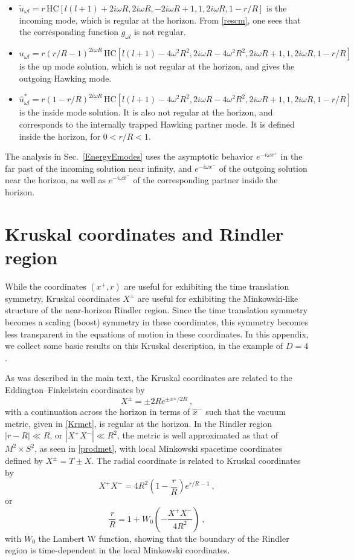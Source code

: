 \documentclass[12pt]{article}
\numberwithin{equation}{section}
\newcommand{\beq}{\begin{equation}}
\newcommand{\eeq}{\end{equation}}
\begin{document}
\begin{itemize}
\item $\tilde{u}_{\omega l} = r \, \mathrm{HC}[l(l+1)+2 i \omega R, 2 i \omega R, -2 i \omega R + 1, 1, 2 i \omega R, 1-r/R]$ is the incoming mode, which is regular at the horizon. From \eqref{rescm}, one sees that the corresponding function $g_{\omega l}$ is not regular.

\item $u_{\omega l} = r(r/R-1)^{2i\omega R} \, \mathrm{HC}[l(l + 1) - 4 \omega^2R^2, 2 i \omega R - 4 \omega^2R^2, 2 i \omega R + 1, 1, 2 i \omega R, 1-r/R]$ is the up mode solution, which is not regular at the horizon, and gives the outgoing Hawking mode.

\item $\hat{u}_{\omega l}^* = r(1-r/R)^{2i\omega R} \, \mathrm{HC}[l(l + 1) - 4 \omega^2R^2, 2 i \omega R - 4 \omega^2R^2, 2 i \omega R + 1, 1, 2 i \omega R,  1-r/R]$ is the inside mode solution. It is also not regular at the horizon, and corresponds to the internally trapped Hawking partner mode. It is defined inside the horizon, for $0<r/R<1$.
\end{itemize}
The analysis in Sec.~\ref{EnergyEmodes} uses the asymptotic behavior  $e^{-i\omega x^+}$ in the far past of the incoming solution near infinity, and  $e^{-i\omega x^-}$ of the outgoing solution near the horizon, as well as $e^{-i\omega \hat{x}^-}$ of the corresponding partner  inside the horizon.

\section{Kruskal coordinates and Rindler region}
\label{Kapp}

While the coordinates $(x^+,r)$ are useful for exhibiting the time translation symmetry, Kruskal coordinates $X^\pm$ are useful for exhibiting the Minkowski-like structure of the near-horizon Rindler region.  Since the time translation symmetry becomes a scaling (boost) symmetry in these coordinates, this symmetry becomes less transparent in the equations of motion in these coordinates.  In this appendix, we collect some basic results on this Kruskal description, in the example of $D=4$.

As was described in the main text, the Kruskal coordinates are related to the Eddington--Finkelstein coordinates by
\beq\label{Kcoorddef}
X^{\pm} = \pm 2R e^{\pm{ x^{\pm}}/{2R}}\ ,
\eeq
with a continuation across the horizon in terms of $\hat x^-$ such that the vacuum metric, given in \eqref{Krmet},  is regular at the horizon.  
In the Rindler region $|r-R|\ll R$, or $|X^+X^-|\ll R^2$, the metric is well approximated as that of $M^2\times S^2$, as seen in \eqref{prodmet}, with local Minkowski spacetime coordinates defined by $X^\pm=T\pm X$.  The radial coordinate is related to Kruskal coordinates by
\beq
X^+X^-=4R^2 \left(1-\frac{r}{R}\right) e^{r/R-1}\ ,
\eeq
or
\beq\label{rtoK}
\frac{r}{R}= 1+ W_0\left(-\frac{X^+X^-}{4R^2 }\right)\ ,
\eeq
with $W_0$ the Lambert W function, showing that the boundary of the Rindler region is time-dependent in the local Minkowski coordinates.  
\end{document}
